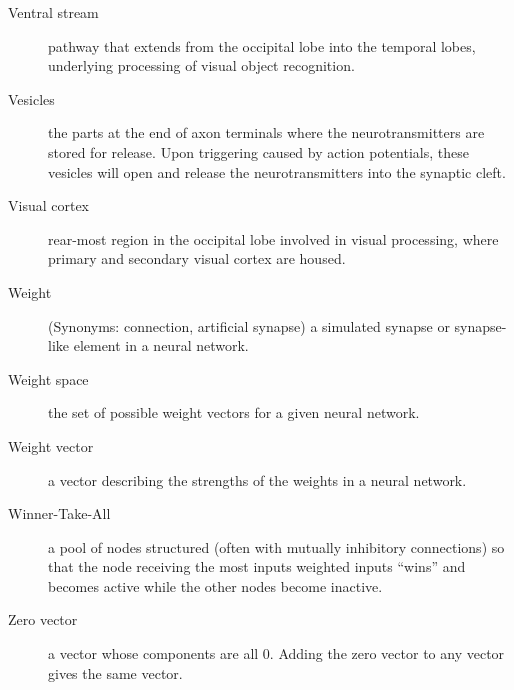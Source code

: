 \begin{description}
\item[Ventral stream] pathway that extends from the occipital lobe into the temporal lobes, underlying processing of visual object recognition. 

\item[Vesicles] the parts at the end of axon terminals where the neurotransmitters are stored for release. Upon triggering caused by action potentials, these vesicles will open and release the neurotransmitters into the synaptic cleft.

\item[Visual cortex] rear-most region in the occipital lobe involved in visual processing, where primary and secondary visual cortex are housed.

\item[Weight] (Synonyms: connection, artificial synapse) a simulated synapse or synapse-like element in a neural network. 


\item[Weight space] the set of possible weight vectors for a given neural network.

\item[Weight vector] a vector describing the strengths of the weights in a neural network.

\item[Winner-Take-All] a pool of nodes structured (often with mutually inhibitory connections) so that the node receiving the most inputs weighted inputs ``wins'' and becomes active while the other nodes become inactive.

\item[Zero vector] a vector whose components are all $0$. Adding the zero vector to any vector gives the same vector.

\end{description}

